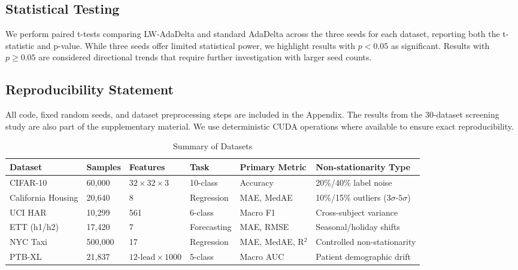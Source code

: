 \documentclass[11pt,a4paper]{article}
\begin{document}
\subsection{Statistical Testing}

We perform paired t-tests comparing LW-AdaDelta and standard AdaDelta across the three seeds for each dataset, reporting both the t-statistic and p-value. While three seeds offer limited statistical power, we highlight results with $p < 0.05$ as significant. Results with $p \ge 0.05$ are considered directional trends that require further investigation with larger seed counts.

\subsection{Reproducibility Statement}

All code, fixed random seeds, and dataset preprocessing steps are included in the Appendix. The results from the 30-dataset screening study are also part of the supplementary material. We use deterministic CUDA operations where available to ensure exact reproducibility.

\begin{table}[H]
\centering
\tiny
\caption{Summary of Datasets}
\label{tab:datasets}
\begin{tabular}{llllll}
\toprule
\textbf{Dataset} & \textbf{Samples} & \textbf{Features} & \textbf{Task} & \textbf{Primary Metric} & \textbf{Non-stationarity Type} \\
\midrule
CIFAR-10 & 60,000 & $32\times32\times3$ & 10-class & Accuracy & 20\%/40\% label noise \\
California Housing & 20,640 & 8 & Regression & MAE, MedAE & 10\%/15\% outliers ($3\sigma$-$5\sigma$) \\
UCI HAR & 10,299 & 561 & 6-class & Macro F1 & Cross-subject variance \\
ETT (h1/h2) & 17,420 & 7 & Forecasting & MAE, RMSE & Seasonal/holiday shifts \\
NYC Taxi & 500,000 & 17 & Regression & MAE, MedAE, R$^2$ & Controlled non-stationarity \\
PTB-XL & 21,837 & $12\text{-lead}\times1000$ & 5-class & Macro AUC & Patient demographic drift \\
\bottomrule
\end{tabular}
\end{table}

\end{document}
